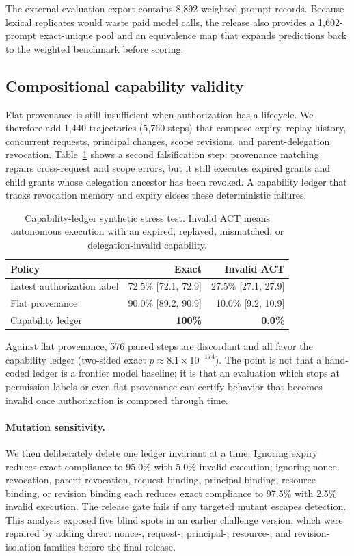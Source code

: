 The external-evaluation export contains 8,892 weighted prompt records. Because lexical replicates would waste paid model calls, the release also provides a 1,602-prompt exact-unique pool and an equivalence map that expands predictions back to the weighted benchmark before scoring.

\subsection{Compositional capability validity}
Flat provenance is still insufficient when authorization has a lifecycle. We therefore add 1,440 trajectories (5,760 steps) that compose expiry, replay history, concurrent requests, principal changes, scope revisions, and parent-delegation revocation. Table~\ref{tab:ledger} shows a second falsification step: provenance matching repairs cross-request and scope errors, but it still executes expired grants and child grants whose delegation ancestor has been revoked. A capability ledger that tracks revocation memory and expiry closes these deterministic failures.

\begin{table}[t]
\centering\small
\caption{Capability-ledger synthetic stress test. Invalid ACT means autonomous execution with an expired, replayed, mismatched, or delegation-invalid capability.}
\begin{tabular}{lrr}
\toprule
Policy & Exact & Invalid ACT \\
\midrule
Latest authorization label & 72.5\% [72.1, 72.9] & 27.5\% [27.1, 27.9] \\
Flat provenance & 90.0\% [89.2, 90.9] & 10.0\% [9.2, 10.9] \\
Capability ledger & \textbf{100\%} & \textbf{0.0\%} \\
\bottomrule
\end{tabular}
\label{tab:ledger}
\end{table}

Against flat provenance, 576 paired steps are discordant and all favor the capability ledger (two-sided exact $p\approx8.1\times10^{-174}$). The point is not that a hand-coded ledger is a frontier model baseline; it is that an evaluation which stops at permission labels or even flat provenance can certify behavior that becomes invalid once authorization is composed through time.

\paragraph{Mutation sensitivity.} We then deliberately delete one ledger invariant at a time. Ignoring expiry reduces exact compliance to 95.0\% with 5.0\% invalid execution; ignoring nonce revocation, parent revocation, request binding, principal binding, resource binding, or revision binding each reduces exact compliance to 97.5\% with 2.5\% invalid execution. The release gate fails if any targeted mutant escapes detection. This analysis exposed five blind spots in an earlier challenge version, which were repaired by adding direct nonce-, request-, principal-, resource-, and revision-isolation families before the final release.


